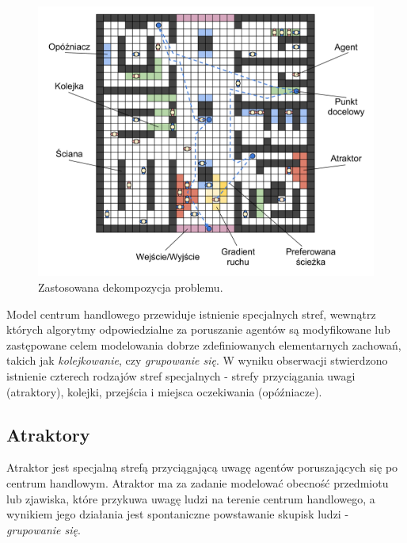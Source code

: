 \documentclass[a4paper, 12pt]{article}
\begin{document}
    \begin{figure}[H]
        \centering
        \includegraphics[scale=0.3]{./img/Overview.pdf}
        \caption{Zastosowana dekompozycja problemu.}
        \label{fig:overview}
    \end{figure}

Model centrum handlowego przewiduje istnienie specjalnych stref, wewnątrz których algorytmy odpowiedzialne za poruszanie agentów są modyfikowane lub zastępowane celem modelowania dobrze zdefiniowanych elementarnych zachowań, takich jak \emph{kolejkowanie}, czy \emph{grupowanie się}. W wyniku obserwacji stwierdzono istnienie czterech rodzajów stref specjalnych - strefy przyciągania uwagi (atraktory), kolejki, przejścia i miejsca oczekiwania (opóźniacze).

    \subsection{Atraktory}
    \label{sec:attractors}

Atraktor jest specjalną strefą przyciągającą uwagę agentów poruszających się po centrum handlowym. Atraktor ma za zadanie modelować obecność przedmiotu lub zjawiska, które przykuwa uwagę ludzi na terenie centrum handlowego, a wynikiem jego działania jest spontaniczne powstawanie skupisk ludzi - \emph{grupowanie się}.
\end{document}
